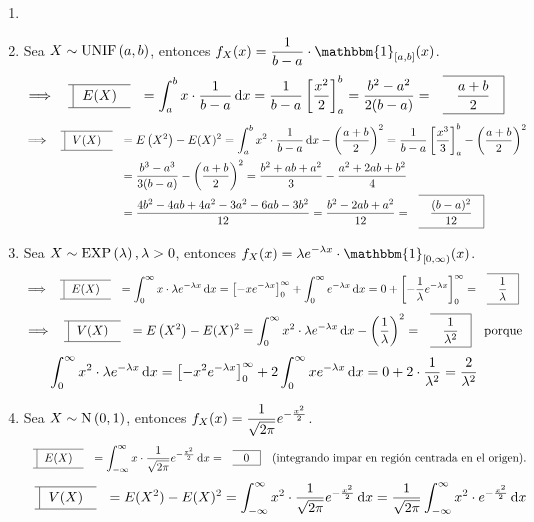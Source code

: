 \begin{ejem}
	\begin{enumerate}
		\item[]
		\item Sea $\displaystyle X\sim\operatorname{UNIF}\left(a,b\right)$, entonces $\ds f_X(x)=\frac{1}{b-a}\cdot \mathbbm{1}_{[a,b]}(x)$.
		      \[\implies \lbox{E(X)} = \int_{a}^{b} x \cdot \frac{1}{b-a} \odif{x} = \frac{1}{b-a} \left[\frac{x^2}{2}\right]_{a}^{b} = \frac{b^2-a^2}{2(b-a)} = \rbox{\ds \frac{a+b}{2}}\]
		      \[\begin{aligned}
				      \implies \lbox{V(X)} & = E\left(X^2\right) - E(X)^2 = \int_{a}^{b} x^2 \cdot \frac{1}{b-a} \odif{x} - \left(\frac{a+b}{2}\right)^2 = \frac{1}{b-a} \left[\frac{x^3}{3}\right]_{a}^{b} - \left(\frac{a+b}{2}\right)^2 \\
				                           & = \frac{b^3-a^3}{3(b-a)} - \left(\frac{a+b}{2}\right)^2 = \frac{b^2+ab+a^2}{3} - \frac{a^2+2ab+b^2}{4}                                                                                        \\
				                           & = \frac{4b^2-4ab+4a^2-3a^2-6ab-3b^2}{12} = \frac{b^2-2ab+a^2}{12} = \rbox{\ds \frac{(b-a)^2}{12}}
			      \end{aligned}\]
		\item Sea $X\sim\operatorname{EXP}\left(\lambda\right), \lambda > 0$, entonces $\ds f_X(x)=\lambda e^{-\lambda x} \cdot \mathbbm{1}_{[0,\infty)}(x)$.
		      \[\implies \lbox{E(X)}= \int_{0}^{\infty} x \cdot \lambda e^{-\lambda x} \odif{x} = \left[-x e^{-\lambda x}\right]_{0}^{\infty} + \int_{0}^{\infty} e^{-\lambda x} \odif{x} = 0 + \left[-\frac{1}{\lambda} e^{-\lambda x}\right]_{0}^{\infty} = \rbox{\ds \frac{1}{\lambda}}\]
		      \[\implies \lbox{V(X)} = E\left(X^2\right) - E(X)^2 = \int_{0}^{\infty} x^2 \cdot \lambda e^{-\lambda x} \odif{x} - \left(\frac{1}{\lambda}\right)^2 = \rbox{\ds \frac{1}{\lambda^2}} \tex{ porque }\]
		      \[\int_{0}^{\infty} x^2 \cdot \lambda e^{-\lambda x} \odif{x} = \left[-x^2 e^{-\lambda x}\right]_{0}^{\infty} + 2\int_{0}^{\infty} x e^{-\lambda x} \odif{x} = 0 + 2 \cdot\frac{1}{\lambda^2} = \frac{2}{\lambda^2}\]
		\item Sea $X\sim\operatorname{N}\left(0, 1\right)$, entonces $\displaystyle f_X(x)=\frac{1}{\sqrt{2\pi}} e^{-\frac{x^2}{2}}$.
		      \[\lbox{E(X)} = \int_{-\infty}^{\infty} x \cdot \frac{1}{\sqrt{2\pi}} e^{-\frac{x^2}{2}} \odif{x} = \rbox{0} \tex{  (integrando impar en región centrada en el origen).}\]
		      \[\begin{aligned}
				      \lbox{V(X)} & = E(X^2) - E(X)^2 = \int_{-\infty}^{\infty} x^2 \cdot \frac{1}{\sqrt{2\pi}} e^{-\frac{x^2}{2}} \odif{x} = \frac{1}{\sqrt{2\pi}} \int_{-\infty}^{\infty} x^2 \cdot e^{-\frac{x^2}{2}} \odif{x}                   \\

\end{aligned}\]
\end{enumerate}
\end{ejem}
